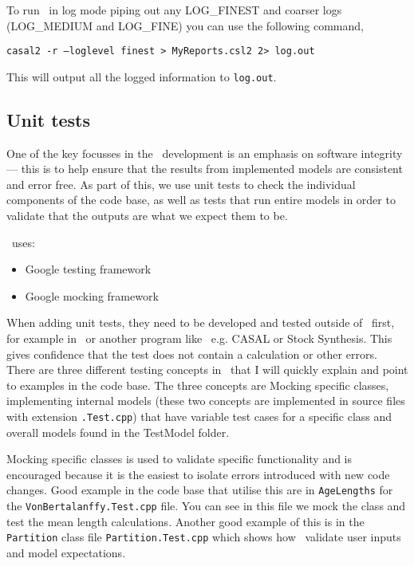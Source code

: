 To run \CNAME\ in log mode piping out any LOG\_FINEST and coarser logs (LOG\_MEDIUM and LOG\_FINE) you can use the following command,

\texttt{casal2 -r --loglevel finest > MyReports.csl2 2> log.out}

This will output all the logged information to \texttt{log.out}.

\subsection{Unit tests}

One of the key focusses in the \CNAME\ development is an emphasis on software integrity --- this is to help ensure that the results from implemented models are consistent and error free. As part of this, we use unit tests to check the individual components of the code base, as well as tests that run entire models in order to validate that the outputs are what we expect them to be.

\CNAME\ uses:
\begin{itemize}
	\item Google testing framework
	\item Google mocking framework
\end{itemize}

When adding unit tests, they need to be developed and tested outside of \CNAME\  first, for example in \R\ or another program like \CNAME\ e.g. CASAL or Stock Synthesis. This gives confidence that the test does not contain a calculation or other errors. There are three different testing concepts in \CNAME\ that I will quickly explain and point to examples in the code base. The three concepts are Mocking specific classes, implementing internal models (these two concepts are implemented in source files with extension \texttt{.Test.cpp}) that have variable test cases for a specific class and overall models found in the TestModel folder.

Mocking specific classes is used to validate specific functionality and is encouraged because it is the easiest to isolate errors introduced with new code changes. Good example in the code base that utilise this are in \texttt{AgeLengths} for the \texttt{VonBertalanffy.Test.cpp} file. You can see in this file we mock the class and test the mean length calculations. Another good example of this is in the \texttt{Partition} class file \texttt{Partition.Test.cpp} which shows how \CNAME\ validate user inputs and model expectations.


